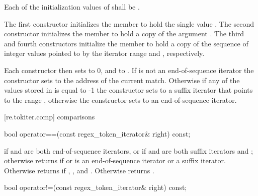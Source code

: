 \begin{itemdescr}
\pnum
\requires Each of the initialization values of  shall be .

\pnum
\effects The first constructor initializes the member  to hold the single
value . The second constructor initializes the member  to
hold a copy of the argument . The third and fourth constructors
initialize the member  to hold a copy of the sequence of integer values
pointed to by the iterator range  and
, respectively.

\pnum
Each constructor then sets  to 0, and  to
. If  is not an
end-of-sequence iterator the constructor sets  to the
address of the current match. Otherwise if any of the values stored
in  is equal to -1 the constructor sets  to a suffix
iterator that points to the range , otherwise the constructor
sets  to an end-of-sequence iterator.
\end{itemdescr}

[re.tokiter.comp]{ comparisons}

%
%
\begin{itemdecl}
bool operator==(const regex_token_iterator& right) const;
\end{itemdecl}

\begin{itemdescr}
\pnum
\returns  {} if  and  are both end-of-sequence iterators,
or if  and  are both suffix iterators and ;
otherwise returns  if  or  is an end-of-sequence
iterator or a suffix iterator. Otherwise returns  if ,
, and . Otherwise returns .
\end{itemdescr}

%
%
\begin{itemdecl}
bool operator!=(const regex_token_iterator& right) const;
\end{itemdecl}

